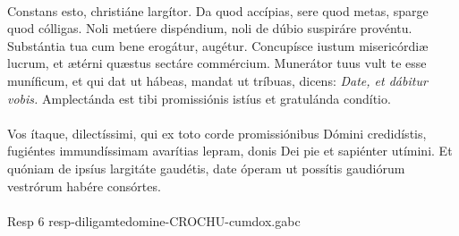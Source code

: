 \documentclass[options]{article}
\begin{document}
	\\
	Constans esto, christiáne largítor. Da quod accípias, sere quod metas, sparge quod cólligas. Noli metúere dispéndium, noli de dúbio suspiráre provéntu. Substántia tua cum bene erogátur, augétur. Concupísce iustum misericórdiæ lucrum, et ætérni quæstus sectáre commércium. Munerátor tuus vult te esse muníficum, et qui dat ut hábeas, mandat ut tríbuas, dicens: \emph{Date, et dábitur vobis.} Amplectánda est tibi promissiónis istíus et gratulánda condítio.\\
	\\
	Vos ítaque, dilectíssimi, qui ex toto corde promissiónibus Dómini credidístis, fugiéntes immundíssimam avarítias lepram, donis Dei pie et sapiénter utímini. Et quóniam de ipsíus largitáte gaudétis, date óperam ut possítis gaudiórum vestrórum habére consórtes.\\
	\\
	Resp 6 resp-diligamtedomine-CROCHU-cumdox.gabc
\end{document}
